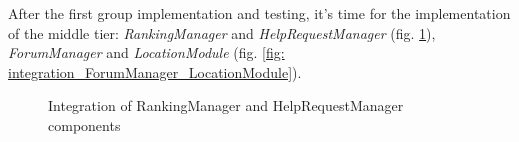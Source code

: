 \documentclass[table, 12pt]{article}
\begin{document}
After the first group implementation and testing, it's time for the implementation of the middle tier: \emph{RankingManager} and \emph{HelpRequestManager} (fig. \ref{fig: integration_RankingManager_HelpRequestManager}), \emph{ForumManager}
 and \emph{LocationModule} (fig. \ref{fig: integration_ForumManager_LocationModule}).
\begin{figure}[H]
    \centering
    \qquad\qquad
    \caption{Integration of RankingManager and HelpRequestManager components}%
    \label{fig: integration_RankingManager_HelpRequestManager}%
\end{figure}
\end{document}
